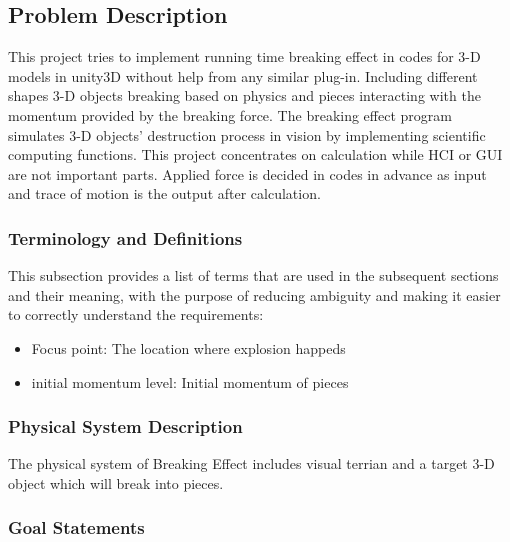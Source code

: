\documentclass[12pt]{article}
\newcommand{\progname}{Breaking Effect} %
\begin{document}
\subsection{Problem Description} \label{Sec_pd}

This project tries to implement running time breaking effect in codes for 3-D models in unity3D without help from any similar plug-in. Including different shapes 3-D objects breaking based on physics and pieces interacting with the momentum provided by the breaking force. The breaking effect program simulates 3-D objects’ destruction process in vision by implementing scientific computing functions. This project concentrates on calculation while HCI or GUI are not important parts. Applied force is decided in codes in advance as input and trace of motion is the output after calculation.

\subsubsection{Terminology and  Definitions}

This subsection provides a list of terms that are used in the subsequent
sections and their meaning, with the purpose of reducing ambiguity and making it
easier to correctly understand the requirements:

\begin{itemize}

\item Focus point: The location where explosion happeds
\item initial momentum level: Initial momentum of pieces  

\end{itemize}

\subsubsection{Physical System Description}

The physical system of \progname{} includes visual terrian and a target 3-D object which will break into pieces.


\subsubsection{Goal Statements}
\end{document}

